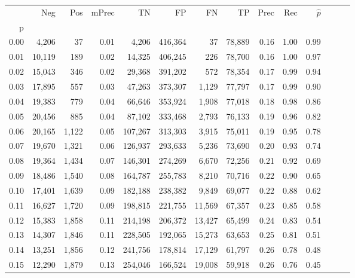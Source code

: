 \begin{tabular}{rrrrrrrrrrrrrr}
\toprule
{} &     Neg &    Pos & mPrec &       TN &       FP &      FN &      TP &  Prec &   Rec & $\hat{p}$ \\
p    &         &        &       &          &          &         &         &       &       &           \\
\midrule
0.00 &   4,206 &     37 &  0.01 &    4,206 &  416,364 &      37 &  78,889 &  0.16 &  1.00 &      0.99 \\
0.01 &  10,119 &    189 &  0.02 &   14,325 &  406,245 &     226 &  78,700 &  0.16 &  1.00 &      0.97 \\
0.02 &  15,043 &    346 &  0.02 &   29,368 &  391,202 &     572 &  78,354 &  0.17 &  0.99 &      0.94 \\
0.03 &  17,895 &    557 &  0.03 &   47,263 &  373,307 &   1,129 &  77,797 &  0.17 &  0.99 &      0.90 \\
0.04 &  19,383 &    779 &  0.04 &   66,646 &  353,924 &   1,908 &  77,018 &  0.18 &  0.98 &      0.86 \\
0.05 &  20,456 &    885 &  0.04 &   87,102 &  333,468 &   2,793 &  76,133 &  0.19 &  0.96 &      0.82 \\
0.06 &  20,165 &  1,122 &  0.05 &  107,267 &  313,303 &   3,915 &  75,011 &  0.19 &  0.95 &      0.78 \\
0.07 &  19,670 &  1,321 &  0.06 &  126,937 &  293,633 &   5,236 &  73,690 &  0.20 &  0.93 &      0.74 \\
0.08 &  19,364 &  1,434 &  0.07 &  146,301 &  274,269 &   6,670 &  72,256 &  0.21 &  0.92 &      0.69 \\
0.09 &  18,486 &  1,540 &  0.08 &  164,787 &  255,783 &   8,210 &  70,716 &  0.22 &  0.90 &      0.65 \\
0.10 &  17,401 &  1,639 &  0.09 &  182,188 &  238,382 &   9,849 &  69,077 &  0.22 &  0.88 &      0.62 \\
0.11 &  16,627 &  1,720 &  0.09 &  198,815 &  221,755 &  11,569 &  67,357 &  0.23 &  0.85 &      0.58 \\
0.12 &  15,383 &  1,858 &  0.11 &  214,198 &  206,372 &  13,427 &  65,499 &  0.24 &  0.83 &      0.54 \\
0.13 &  14,307 &  1,846 &  0.11 &  228,505 &  192,065 &  15,273 &  63,653 &  0.25 &  0.81 &      0.51 \\
0.14 &  13,251 &  1,856 &  0.12 &  241,756 &  178,814 &  17,129 &  61,797 &  0.26 &  0.78 &      0.48 \\
0.15 &  12,290 &  1,879 &  0.13 &  254,046 &  166,524 &  19,008 &  59,918 &  0.26 &  0.76 &      0.45 \\

\end{tabular}
